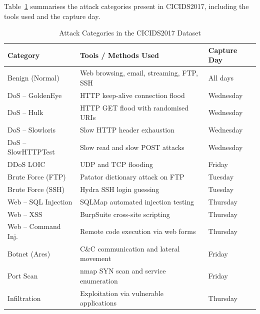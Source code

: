 Table~\ref{tab:attacks} summarises the attack categories present in CICIDS2017, including the tools used and the capture day.

\begin{table}[H]
\centering
\caption{Attack Categories in the CICIDS2017 Dataset}
\label{tab:attacks}
\begin{tabular}{lp{6.5cm}l}
\toprule
\textbf{Category} & \textbf{Tools / Methods Used} & \textbf{Capture Day} \\
\midrule
Benign (Normal)        & Web browsing, email, streaming, FTP, SSH         & All days  \\
DoS -- GoldenEye       & HTTP keep-alive connection flood                  & Wednesday \\
DoS -- Hulk            & HTTP GET flood with randomised URIs               & Wednesday \\
DoS -- Slowloris       & Slow HTTP header exhaustion                       & Wednesday \\
DoS -- SlowHTTPTest    & Slow read and slow POST attacks                   & Wednesday \\
DDoS LOIC              & UDP and TCP flooding                              & Friday    \\
Brute Force (FTP)      & Patator dictionary attack on FTP                  & Tuesday   \\
Brute Force (SSH)      & Hydra SSH login guessing                          & Tuesday   \\
Web -- SQL Injection   & SQLMap automated injection testing                & Thursday  \\
Web -- XSS             & BurpSuite cross-site scripting                    & Thursday  \\
Web -- Command Inj.    & Remote code execution via web forms               & Thursday  \\
Botnet (Ares)          & C\&C communication and lateral movement           & Friday    \\
Port Scan              & nmap SYN scan and service enumeration             & Friday    \\
Infiltration           & Exploitation via vulnerable applications          & Thursday  \\
\bottomrule
\end{tabular}
\end{table}

